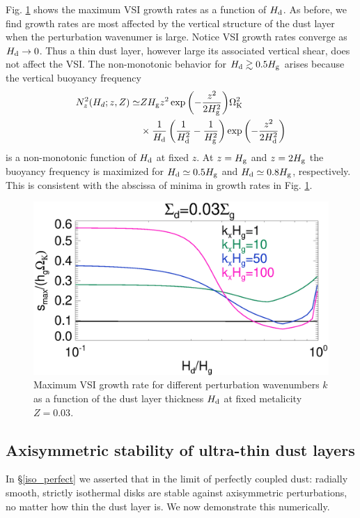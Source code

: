 Fig. \ref{compare_eigenvals_fixZ} shows the maximum VSI growth rates
as a function of $H_\mathrm{d}$. As before, we find growth
rates are most affected by the vertical structure of the dust layer
when the perturbation wavenumer is large. Notice VSI growth rates converge as
$H_\mathrm{d}\to 0$. %
Thus a thin dust layer, however large its associated vertical shear,
does not affect the VSI. The non-monotonic behavior for $H_\mathrm{d}\gtrsim
0.5H_\mathrm{g}$ arises because the vertical buoyancy frequency 
\begin{align*}
N_z^2(H_d;z,Z) \simeq &ZH_\mathrm{g} z^2
\exp{\left(-\frac{z^2}{2H_\mathrm{g}^2}\right)}\Omega_{\rm K}^2\notag\\
&\times 
\frac{1}{H_\mathrm{d}}\left(\frac{1}{H_\mathrm{d}^2} -
\frac{1}{H_\mathrm{g}^2}\right)\exp{\left(-\frac{z^2}{2H_\mathrm{d}^2}\right)}  
\end{align*}
is a non-monotonic function of $H_\mathrm{d}$ at fixed $z$. At $z=H_\mathrm{g}$ and $z=2H_\mathrm{g}$
the buoyancy frequency is maximized for $H_\mathrm{d}\simeq0.5H_\mathrm{g}$ and
$H_\mathrm{d}\simeq 0.8H_\mathrm{g}$, respectively. This is consistent with the abscissa
of minima in growth rates in Fig. \ref{compare_eigenvals_fixZ}. 

\begin{figure}
  \includegraphics[width=\linewidth]{figures/compare_eigenvals_fixZ} 
  \caption{Maximum VSI growth rate for different perturbation
    wavenumbers $k$ as a function of the dust layer
    thickness $H_\mathrm{d}$ at fixed metalicity $Z=0.03$. 
    \label{compare_eigenvals_fixZ}
    }
\end{figure}

\subsection{Axisymmetric stability of ultra-thin dust layers}
In \S\ref{iso_perfect} we asserted that in the limit of perfectly
coupled dust: radially smooth, strictly
isothermal disks are stable against axisymmetric perturbations, no
matter how thin the dust layer is. We now demonstrate this
numerically. 

